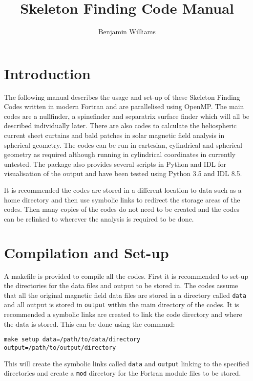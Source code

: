 \documentclass[12pt]{article}
\author{Benjamin Williams}
\title{Skeleton Finding Code Manual}
\begin{document}
  \maketitle

  \section{Introduction}

    The following manual describes the usage and set-up of these Skeleton Finding Codes written in modern Fortran and are parallelised using OpenMP. The main codes are a nullfinder, a spinefinder and separatrix surface finder which will all be described individually later. There are also codes to calculate the heliospheric current sheet curtains and bald patches in solar magnetic field analysis in spherical geometry. The codes can be run in cartesian, cylindrical and spherical geometry as required although running in cylindrical coordinates in currently untested. The package also provides several scripts in Python and IDL for visualisation of the output and have been tested using Python 3.5 and IDL 8.5.
    
    It is recommended the codes are stored in a different location to data such as a home directory and then use symbolic links to redirect the storage areas of the codes. Then many copies of the codes do not need to be created and the codes can be relinked to wherever the analysis is required to be done. 

    \section{Compilation and Set-up}

    A makefile is provided to compile all the codes. First it is recommended to set-up the directories for the data files and output to be stored in. The codes assume that all the original magnetic field data files are stored in a directory called \texttt{data} and all output is stored in \texttt{output} within the main directory of the codes. It is recommended a symbolic links are created to link the code directory and where the data is stored. This can be done using the command:

    \texttt{make setup data=/path/to/data/directory output=/path/to/output/directory}

    This will create the symbolic links called \texttt{data} and \texttt{output} linking to the specified directories and create a \texttt{mod} directory for the Fortran module files to be stored.
\end{document}
